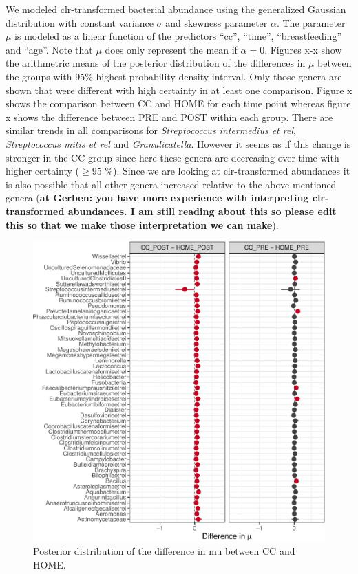\documentclass[,man]{apa6}
\begin{document}
We modeled clr-transformed bacterial abundance using the generalized
Gaussian distribution with constant variance \(\sigma\) and skewness
parameter \(\alpha\). The parameter \(\mu\) is modeled as a linear
function of the predictors \enquote{cc}, \enquote{time},
\enquote{breastfeeding} and \enquote{age}. Note that \(\mu\) does only
represent the mean if \(\alpha = 0\). Figures x-x show the arithmetric
means of the posterior distribution of the differences in \(\mu\)
between the groups with 95\% highest probability density interval. Only
those genera are shown that were different with high certainty in at
least one comparison. Figure x shows the comparison between CC and HOME
for each time point whereas figure x shows the difference between PRE
and POST within each group. There are similar trends in all comparisons
for \emph{Streptococcus intermedius et rel}, \emph{Streptococcus mitis
et rel} and \emph{Granulicatella}. However it seems as if this change is
stronger in the CC group since here these genera are decreasing over
time with higher certainty (\(\geq 95\) \%). Since we are looking at
clr-transformed abundances it is also possible that all other genera
increased relative to the above mentioned genera (\textbf{at Gerben: you
have more experience with interpreting clr-transformed abundances. I am
still reading about this so please edit this so that we make those
interpretation we can make}).

\begin{figure}
\centering
\includegraphics{index_files/figure-latex/unnamed-chunk-11-1.pdf}
\caption{\label{fig:unnamed-chunk-11}Posterior distribution of the
difference in mu between CC and HOME.}
\end{figure}
\end{document}

